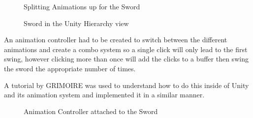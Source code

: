 \documentclass[12pt]{report}
\begin{document}
\begin{figure}[H]
    \begin{minipage}{.5\textwidth}
        \centering
        \caption{Splitting Animations up for the Sword}
    \end{minipage}
    \begin{minipage}{.5\textwidth}
        \centering
        \caption{Sword in the Unity Hierarchy view}
    \end{minipage}
\end{figure}

An animation controller had to be created to switch between the different animations and create a combo system so a single click will only lead to the first swing, however clicking more than once will add the clicks to a buffer then swing the sword the appropriate number of times.

A tutorial by GRIMOIRE \cite{comboSystem} was used to understand how to do this inside of Unity and its animation system and implemented it in a similar manner.

\begin{figure}[H]
    \centering
    \caption{Animation Controller attached to the Sword}
\end{figure}
\end{document}
